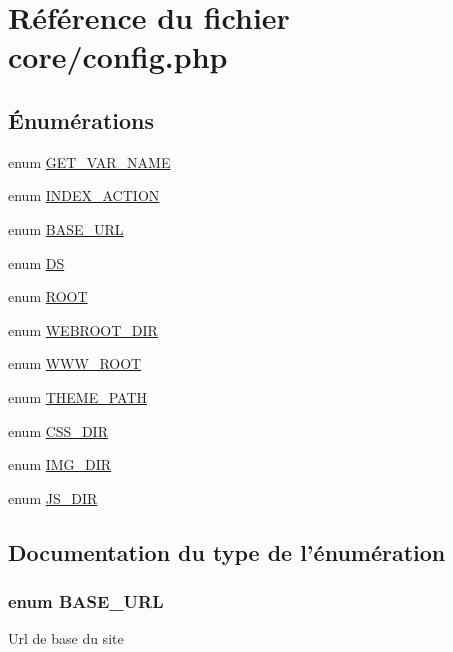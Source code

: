 \hypertarget{config_8php}{\section{Référence du fichier core/config.php}
\label{config_8php}
}
\subsection*{Énumérations}
\begin{DoxyCompactItemize}
\item 
enum \hyperlink{config_8php_ade5667635816e5abbe1edeac7581893e}{G\-E\-T\-\_\-\-V\-A\-R\-\_\-\-N\-A\-M\-E} 
\item 
enum \hyperlink{config_8php_a57597912779f7a405b4930ca59fbbb8e}{I\-N\-D\-E\-X\-\_\-\-A\-C\-T\-I\-O\-N} 
\item 
enum \hyperlink{config_8php_a16548ab75ed30cbddce178d56d26dbb8}{B\-A\-S\-E\-\_\-\-U\-R\-L} 
\item 
enum \hyperlink{config_8php_a78edc178185545ab482d543f266866eb}{D\-S} 
\item 
enum \hyperlink{config_8php_a2f226c0dc7872631f02dca304d41628f}{R\-O\-O\-T} 
\item 
enum \hyperlink{config_8php_acc89219e61ea2ce8121b3869250a8f0f}{W\-E\-B\-R\-O\-O\-T\-\_\-\-D\-I\-R} 
\item 
enum \hyperlink{config_8php_a4b96c2dcb0982d6857b9579a76f18a5f}{W\-W\-W\-\_\-\-R\-O\-O\-T} 
\item 
enum \hyperlink{config_8php_adbfa097c031b87f55b79b857a54302f8}{T\-H\-E\-M\-E\-\_\-\-P\-A\-T\-H} 
\item 
enum \hyperlink{config_8php_a09748c20c209cc20be94d4681b442462}{C\-S\-S\-\_\-\-D\-I\-R} 
\item 
enum \hyperlink{config_8php_a632b7eb8132b844ff697126db5aecd87}{I\-M\-G\-\_\-\-D\-I\-R} 
\item 
enum \hyperlink{config_8php_a63dff59e90953dccafc9076fdf0b1a70}{J\-S\-\_\-\-D\-I\-R} 
\end{DoxyCompactItemize}


\subsection{Documentation du type de l'énumération}
\hypertarget{config_8php_a16548ab75ed30cbddce178d56d26dbb8}{
\subsubsection[{B\-A\-S\-E\-\_\-\-U\-R\-L}]{\setlength{\rightskip}{0pt plus 5cm}enum {\bf B\-A\-S\-E\-\_\-\-U\-R\-L}}}\label{config_8php_a16548ab75ed30cbddce178d56d26dbb8}
Url de base du site 

